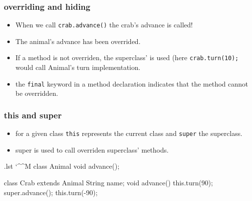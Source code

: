 \documentclass[10pt, handout]{beamer}
\makeatletter
\newenvironment{code}{%
  \begingroup
  \@bsphack
  \immediate\openout\lstvrb@out\jobname.lst
  \let\do\@makeother\dospecials\catcode`\^^M\active
  \def\verbatim@processline{%
    \immediate\write\lstvrb@out{\the\verbatim@line}}%
  \verbatim@start}{%
  \immediate\closeout\lstvrb@out
  \@esphack
  \endgroup
  
  \begin{alertblock}{}
    
  \end{alertblock}}
\makeatother
\begin{document}
\begin{frame}[fragile]
\frametitle{overriding and hiding}
\begin{itemize}
  \item When we call \verb!crab.advance()! the crab's advance is called!
  \item The animal's advance has been overrided.
  \item If a method is not overriden, the superclass' is used (here \verb!crab.turn(10);! would call Animal's turn implementation.
  \item the \alert{\verb!final!} keyword in a method declaration indicates that the method cannot be overridden.
\end{itemize}

\end{frame}

\begin{frame}
\frametitle{this and super}
  \begin{itemize}
    \item for a given class \alert{\verb!this!} represents the current class and \alert{\verb!super!} the superclass. 
    \item super is used to call overriden superclass' methods.
  \end{itemize}
  \begin{code}
class Animal {
  void advance();    
}

class Crab extends Animal{
  String name;
  void advance() {
    this.turn(90);
    super.advance();
    this.turn(-90);
  }
}
\end{code}
\end{frame}
\end{document}
